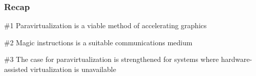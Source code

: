 \begin{frame}
\frametitle{Recap}

\begin{block}{\#1}
	Paravirtualization is a viable method of accelerating graphics
\end{block}

\begin{block}{\#2}
	Magic instructions is a suitable communications medium
\end{block}

\begin{block}{\#3}
	The case for paravirtualization is strengthened for systems where hardware-assisted virtualization is unavailable
\end{block}

\end{frame}
